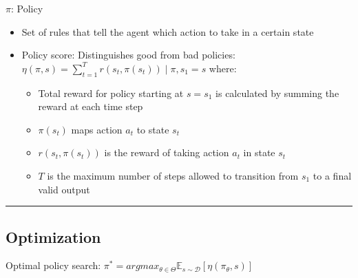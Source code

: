 $\pi$: Policy
\begin{itemize}
    \item Set of rules that tell the agent which action to take in a certain state
    \item Policy score: Distinguishes good from bad policies:
    $
    \eta(\pi, s) = \sum_{t=1}^T r(s_t, \pi(s_t)) \mid \pi, s_1 = s
    $
    where:
    \begin{itemize}
        \item Total reward for policy starting at $s = s_1$ is calculated by summing the reward at each time step
        \item $\pi(s_t)$ maps action $a_t$ to state $s_t$
        \item $r(s_t, \pi(s_t))$ is the reward of taking action $a_t$ in state $s_t$
        \item $T$ is the maximum number of steps allowed to transition from $s_1$ to a final valid output
    \end{itemize}
\end{itemize}

{\color{black}\hrule height 0.001mm}

\subsection*{Optimization}
Optimal policy search:
$
\pi^* = argmax_{\theta \in \Theta} \mathbb{E}_{s \sim \mathcal{D}}[\eta(\pi_\theta, s)]
$